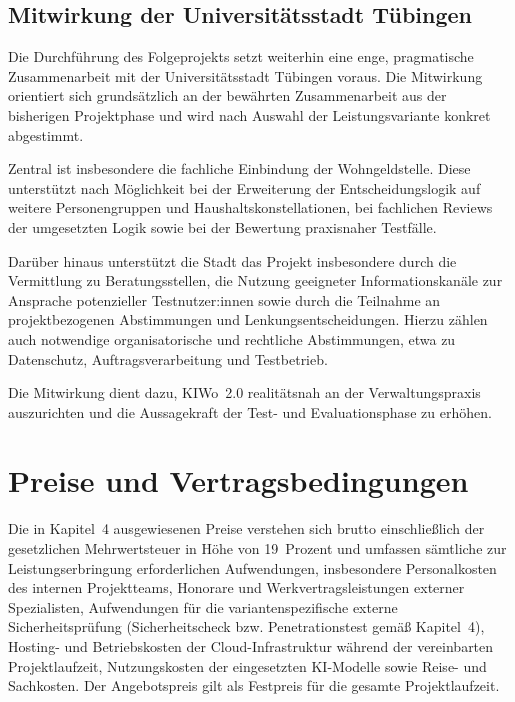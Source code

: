 \documentclass[11pt,a4paper,openany]{report}
\begin{document}
\section{Mitwirkung der Universitätsstadt Tübingen}

Die Durchführung des Folgeprojekts setzt weiterhin eine enge,
pragmatische Zusammenarbeit mit der Universitätsstadt Tübingen voraus.
Die Mitwirkung orientiert sich grundsätzlich an der bewährten
Zusammenarbeit aus der bisherigen Projektphase und wird nach Auswahl der
Leistungsvariante konkret abgestimmt.

Zentral ist insbesondere die fachliche Einbindung der Wohngeldstelle.
Diese unterstützt nach Möglichkeit bei der Erweiterung der
Entscheidungslogik auf weitere Personengruppen und Haushaltskonstellationen,
bei fachlichen Reviews der umgesetzten Logik sowie bei der Bewertung
praxisnaher Testfälle.

Darüber hinaus unterstützt die Stadt das Projekt insbesondere durch
die Vermittlung zu Beratungsstellen, die Nutzung geeigneter
Informationskanäle zur Ansprache potenzieller Testnutzer:innen sowie
durch die Teilnahme an projektbezogenen Abstimmungen und
Lenkungsentscheidungen. Hierzu zählen auch notwendige organisatorische
und rechtliche Abstimmungen, etwa zu Datenschutz, Auftragsverarbeitung
und Testbetrieb.

Die Mitwirkung dient dazu, KIWo~2.0 realitätsnah an der
Verwaltungspraxis auszurichten und die Aussagekraft der Test- und
Evaluationsphase zu erhöhen.

\chapter{Preise und Vertragsbedingungen}

Die in Kapitel~4 ausgewiesenen Preise verstehen sich brutto
einschließlich der gesetzlichen Mehrwertsteuer in Höhe von
19~Prozent und umfassen sämtliche zur Leistungserbringung erforderlichen
Aufwendungen, insbesondere Personalkosten des internen Projektteams,
Honorare und Werkvertragsleistungen externer Spezialisten, Aufwendungen
für die variantenspezifische externe Sicherheitsprüfung (Sicherheitscheck
bzw. Penetrationstest gemäß Kapitel~4), Hosting- und Betriebskosten der
Cloud-Infrastruktur während der vereinbarten Projektlaufzeit,
Nutzungskosten der eingesetzten KI-Modelle sowie Reise- und Sachkosten.
Der Angebotspreis gilt als Festpreis für die gesamte Projektlaufzeit.
\end{document}
